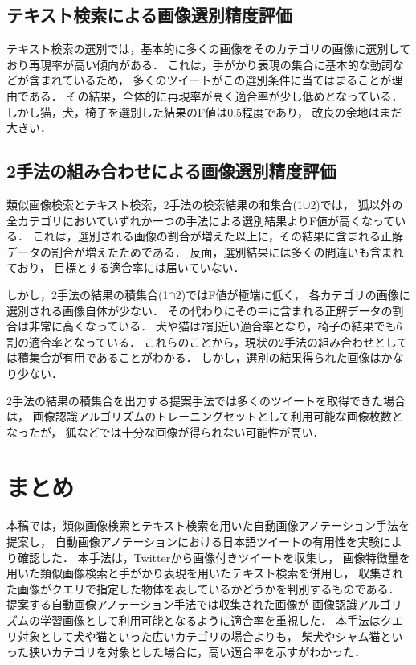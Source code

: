 \documentclass{deimj}
\begin{document}
\subsection{テキスト検索による画像選別精度評価}

テキスト検索の選別では，基本的に多くの画像をそのカテゴリの画像に選別しており再現率が高い傾向がある．
これは，手がかり表現の集合に基本的な動詞などが含まれているため，
多くのツイートがこの選別条件に当てはまることが理由である．
その結果，全体的に再現率が高く適合率が少し低めとなっている．
しかし猫，犬，椅子を選別した結果のF値は0.5程度であり，
改良の余地はまだ大きい．

\subsection{2手法の組み合わせによる画像選別精度評価}
類似画像検索とテキスト検索，2手法の検索結果の和集合(1$\cup$2)では，
狐以外の全カテゴリにおいていずれか一つの手法による選別結果よりF値が高くなっている．
これは，選別される画像の割合が増えた以上に，その結果に含まれる正解データの割合が増えたためである．
反面，選別結果には多くの間違いも含まれており，
目標とする適合率には届いていない．

しかし，2手法の結果の積集合(1$\cap$2)ではF値が極端に低く，
各カテゴリの画像に選別される画像自体が少ない．
その代わりにその中に含まれる正解データの割合は非常に高くなっている．
犬や猫は7割近い適合率となり，椅子の結果でも6割の適合率となっている．
これらのことから，現状の2手法の組み合わせとしては積集合が有用であることがわかる．
しかし，選別の結果得られた画像はかなり少ない．

2手法の結果の積集合を出力する提案手法では多くのツイートを取得できた場合は，
画像認識アルゴリズムのトレーニングセットとして利用可能な画像枚数となったが，
狐などでは十分な画像が得られない可能性が高い．

\section{まとめ}
\label{sec:format}
本稿では，類似画像検索とテキスト検索を用いた自動画像アノテーション手法を提案し，
自動画像アノテーションにおける日本語ツイートの有用性を実験により確認した．
本手法は，Twitterから画像付きツイートを収集し，
画像特徴量を用いた類似画像検索と手がかり表現を用いたテキスト検索を併用し，
収集された画像がクエリで指定した物体を表しているかどうかを判別するものである．
提案する自動画像アノテーション手法では収集された画像が
画像認識アルゴリズムの学習画像として利用可能となるように適合率を重視した．
本手法はクエリ対象として犬や猫といった広いカテゴリの場合よりも，
柴犬やシャム猫といった狭いカテゴリを対象とした場合に，高い適合率を示すがわかった．

\vspace{2em}



\end{document}
